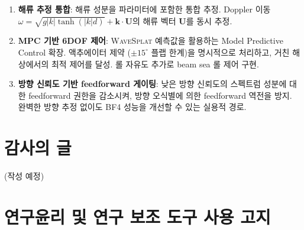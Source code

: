 \documentclass[11pt]{report}
\numberwithin{equation}{chapter}
\numberwithin{figure}{chapter}
\numberwithin{table}{chapter}
\newcommand{\WS}{\textsc{WaveSplat}}
\begin{document}
\begin{enumerate}
  \item \textbf{해류 추정 통합}: 해류 성분을 파라미터에 포함한 통합 추정.
        Doppler 이동 $\omega = \sqrt{g|k|\tanh(|k|d)} + \mathbf{k}\cdot\mathbf{U}$의
        해류 벡터 $\mathbf{U}$를 동시 추정.

  \item \textbf{MPC 기반 6DOF 제어}: \WS{} 예측값을 활용하는
        Model Predictive Control 확장. 액추에이터 제약
        ($\pm 15^\circ$ 플랩 한계)을 명시적으로 처리하고,
        거친 해상에서의 최적 제어를 달성.
        롤 자유도 추가로 beam sea 롤 제어 구현.

  \item \textbf{방향 신뢰도 기반 feedforward 게이팅}: 낮은 방향 신뢰도의
        스펙트럼 성분에 대한 feedforward 권한을 감소시켜,
        방향 오식별에 의한 feedforward 역전을 방지.
        완벽한 방향 추정 없이도 BF4 성능을 개선할 수 있는 실용적 경로.
\end{enumerate}

\newpage



\chapter*{감사의 글}

\vspace{1cm}
\noindent
(작성 예정)


\chapter*{연구윤리 및 연구 보조 도구 사용 고지}
\end{document}
